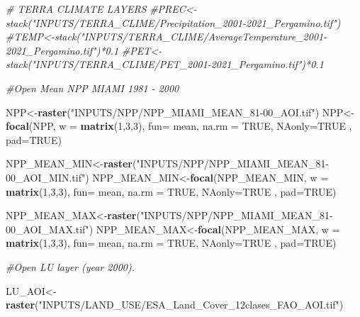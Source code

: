 \documentclass[
  10pt,
  b5paper,
]{book}
\newenvironment{Shaded}{\begin{snugshade}}{\end{snugshade}}
\newcommand{\CommentTok}[1]{\textcolor[rgb]{0.56,0.35,0.01}{\textit{#1}}}
\newcommand{\DataTypeTok}[1]{\textcolor[rgb]{0.13,0.29,0.53}{#1}}
\newcommand{\DecValTok}[1]{\textcolor[rgb]{0.00,0.00,0.81}{#1}}
\newcommand{\KeywordTok}[1]{\textcolor[rgb]{0.13,0.29,0.53}{\textbf{#1}}}
\newcommand{\NormalTok}[1]{#1}
\newcommand{\OtherTok}[1]{\textcolor[rgb]{0.56,0.35,0.01}{#1}}
\newcommand{\StringTok}[1]{\textcolor[rgb]{0.31,0.60,0.02}{#1}}
\begin{document}
\begin{Shaded}
\begin{Highlighting}[]
\CommentTok{# TERRA CLIMATE LAYERS}
\CommentTok{#PREC<-stack("INPUTS/TERRA_CLIME/Precipitation_2001-2021_Pergamino.tif")}
\CommentTok{#TEMP<-stack("INPUTS/TERRA_CLIME/AverageTemperature_2001-2021_Pergamino.tif")*0.1}
\CommentTok{#PET<-stack("INPUTS/TERRA_CLIME/PET_2001-2021_Pergamino.tif")*0.1}

\CommentTok{#Open Mean NPP MIAMI 1981 - 2000}

\NormalTok{NPP<-}\KeywordTok{raster}\NormalTok{(}\StringTok{"INPUTS/NPP/NPP_MIAMI_MEAN_81-00_AOI.tif"}\NormalTok{)}
\NormalTok{NPP<-}\KeywordTok{focal}\NormalTok{(NPP, }\DataTypeTok{w =} \KeywordTok{matrix}\NormalTok{(}\DecValTok{1}\NormalTok{,}\DecValTok{3}\NormalTok{,}\DecValTok{3}\NormalTok{), }\DataTypeTok{fun=}\NormalTok{ mean,  }\DataTypeTok{na.rm =} \OtherTok{TRUE}\NormalTok{, }\DataTypeTok{NAonly=}\OtherTok{TRUE}\NormalTok{ , }\DataTypeTok{pad=}\OtherTok{TRUE}\NormalTok{)}

\NormalTok{NPP_MEAN_MIN<-}\KeywordTok{raster}\NormalTok{(}\StringTok{"INPUTS/NPP/NPP_MIAMI_MEAN_81-00_AOI_MIN.tif"}\NormalTok{)}
\NormalTok{NPP_MEAN_MIN<-}\KeywordTok{focal}\NormalTok{(NPP_MEAN_MIN, }\DataTypeTok{w =} \KeywordTok{matrix}\NormalTok{(}\DecValTok{1}\NormalTok{,}\DecValTok{3}\NormalTok{,}\DecValTok{3}\NormalTok{), }\DataTypeTok{fun=}\NormalTok{ mean,  }\DataTypeTok{na.rm =} \OtherTok{TRUE}\NormalTok{, }\DataTypeTok{NAonly=}\OtherTok{TRUE}\NormalTok{ , }\DataTypeTok{pad=}\OtherTok{TRUE}\NormalTok{)}

\NormalTok{NPP_MEAN_MAX<-}\KeywordTok{raster}\NormalTok{(}\StringTok{"INPUTS/NPP/NPP_MIAMI_MEAN_81-00_AOI_MAX.tif"}\NormalTok{)}
\NormalTok{NPP_MEAN_MAX<-}\KeywordTok{focal}\NormalTok{(NPP_MEAN_MAX, }\DataTypeTok{w =} \KeywordTok{matrix}\NormalTok{(}\DecValTok{1}\NormalTok{,}\DecValTok{3}\NormalTok{,}\DecValTok{3}\NormalTok{), }\DataTypeTok{fun=}\NormalTok{ mean,  }\DataTypeTok{na.rm =} \OtherTok{TRUE}\NormalTok{, }\DataTypeTok{NAonly=}\OtherTok{TRUE}\NormalTok{ , }\DataTypeTok{pad=}\OtherTok{TRUE}\NormalTok{)}

\CommentTok{#Open LU layer (year 2000).}

\NormalTok{LU_AOI<-}\KeywordTok{raster}\NormalTok{(}\StringTok{"INPUTS/LAND_USE/ESA_Land_Cover_12clases_FAO_AOI.tif"}\NormalTok{)}


\end{Highlighting}
\end{Shaded}
\end{document}
